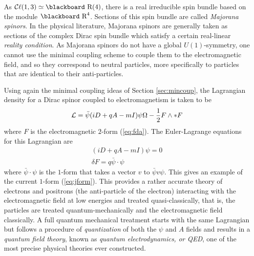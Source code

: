 \documentclass[12pt,titlepage]{article}
\def\bbf#1{\hbox{\blackboard #1}}
\def\lR{\bbf R}
\def\cC{{\cal C}}
\def\cL{{\cal L}}
\def\Cl{{\cC\ell}}
\begin{document}
As \(\Cl(1,3) \simeq \lR(4)\), there is a real irreducible spin bundle 
based on the module \(\lR^4\). Sections of this spin bundle are called
{\em Majorana spinors\/}. In the physical literature, Majorana spinors
are generally taken as sections of the complex Dirac spin bundle which
satisfy a certain real-linear {\em reality condition\/}. As Majorana
spinors do not have a global \(U(1)\)-symmetry, one cannot use the
minimal coupling scheme to couple them to the electromagnetic field, and
so they correspond to neutral particles, more specifically 
to particles that are identical to their anti-particles.

Using again the minimal coupling ideas of Section \ref{sec:mincoup}, the
Lagrangian density for a Dirac spinor coupled to electromagnetism is taken
to  be
\[
\cL = \bar\psi(iD +q A -mI)\psi
\Omega -\frac{1}{2} F\wedge *F
\]
where \(F\) is the electromagnetic \(2\)-form (\ref{eq:fda}). The 
Euler-Lagrange equations for this Lagrangian are
\begin{eqnarray*}
&(iD +qA -mI)\psi =0&\\
&\delta F = q\bar\psi\cdot\psi&
\end{eqnarray*}
where \(\bar\psi\cdot\psi\) is the \(1\)-form that takes a vector \(v\) to 
\(\bar\psi v\psi\).
This gives an example of the current \(1\)-form (\ref{eq:jform}).
This provides a rather accurate theory of electrons and positrons (the
anti-particle of the electron) interacting with the electromagnetic
field at low energies and treated quasi-classically, that is, the
particles are treated quantum-mechanically and the electromagnetic field
classically. A full quantum mechanical treatment starts with the same
Lagrangian but follows a procedure of {\em quantization\/} of both the
\(\psi\) and \(A\) fields and results in a {\em quantum field theory},
known
as {\em quantum
electrodynamics, or QED\/}, one of the most precise physical theories
ever constructed.  
\end{document}
